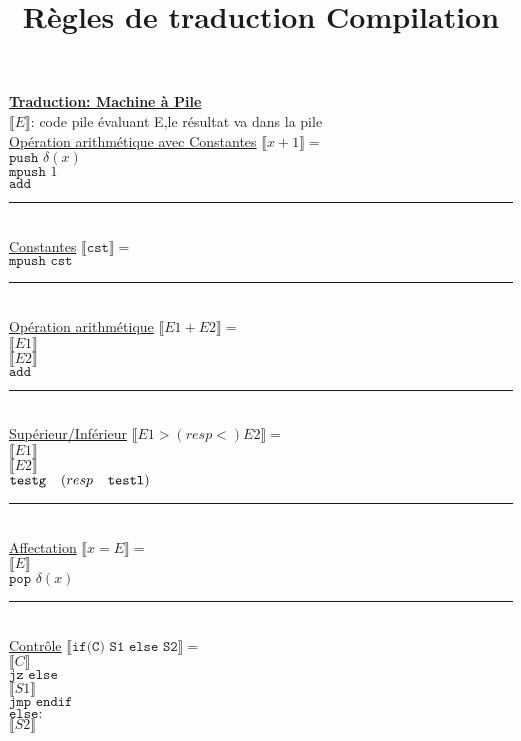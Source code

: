 \documentclass[12pt,twocolumn]{report}
\title{Règles de traduction Compilation}
\date{}
\begin{document}
\Large\underline{\textbf{Traduction: Machine à Pile}}\normalsize\\
$\llbracket E \rrbracket$: code pile évaluant E,le résultat va dans la pile\\
    \underline{Opération arithmétique avec Constantes}
    $\llbracket x +1 \rrbracket = $\\
    $\texttt{push } \delta(x)$\\
    $\texttt{mpush } 1$\\
    $\texttt{add}$\\
\rule{9cm}{0.1pt}\\
    \underline{Constantes}
    $\llbracket \texttt{cst} \rrbracket = $\\
    $\texttt{mpush cst}$\\
\rule{9cm}{0.1pt}\\
    \underline{Opération arithmétique}
    $\llbracket E1+E2 \rrbracket = $\\
    $\llbracket E1 \rrbracket$\\
    $\llbracket E2 \rrbracket$\\
    $\texttt{add}$\\
\rule{9cm}{0.1pt}\\
    \underline{Supérieur/Inférieur}
    $\llbracket E1 > (resp <) E2 \rrbracket = $\\
    $\llbracket E1 \rrbracket$\\
    $\llbracket E2 \rrbracket$\\
    $\texttt{testg}\hphantom{aa}(resp\hphantom{aa} \texttt{testl})$\\
\rule{9cm}{0.1pt}\\
    \underline{Affectation}
    $\llbracket x=E \rrbracket = $\\
    $\llbracket E \rrbracket$\\
    $\texttt{pop } \delta(x)$\\
\rule{9cm}{0.1pt}\\
    \underline{Contrôle}
    $\llbracket \texttt{if(C) S1 else S2} \rrbracket = $\\
    \hphantom{aaaaaa}$\llbracket C \rrbracket$\\
    \hphantom{aaaaaa}$\texttt{jz else}$\\
    \hphantom{aaaaaa}$\llbracket S1 \rrbracket$\\
    \hphantom{aaaaaa}$\texttt{jmp endif}$\\
    $\texttt{else:}$\\
    \hphantom{aaaaaa}$\llbracket S2 \rrbracket$\\
\end{document}
